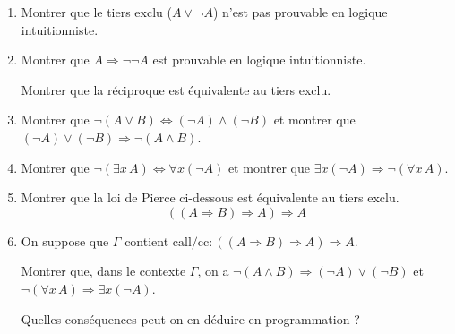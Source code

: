 \documentclass{article}
\begin{document}
\begin{enumerate}
\item Montrer que le tiers exclu (\(A \vee \neg A\)) n'est pas prouvable en logique intuitionniste.
\item Montrer que \(A \Rightarrow \neg \neg A\) est prouvable en logique intuitionniste.

  Montrer que la réciproque est équivalente au tiers exclu.
\item Montrer que \(\neg (A \vee B) \Leftrightarrow (\neg A) \wedge (\neg B)\)
et montrer que \((\neg A) \vee (\neg B) \Rightarrow \neg (A \wedge B)\).
\item Montrer que \(\neg (\exists x \, A) \Leftrightarrow \forall x (\neg A)\)
et montrer que \(\exists x (\neg A) \Rightarrow \neg (\forall x \, A)\).
\item Montrer que la loi de Pierce ci-dessous est équivalente au tiers exclu.
  \[((A \Rightarrow B) \Rightarrow A) \Rightarrow A\]
\item On suppose que \(\Gamma\) contient \(\text{call/cc} : ((A \Rightarrow B) \Rightarrow A) \Rightarrow A\).

Montrer que, dans le contexte \(\Gamma\), on a \(\neg (A \wedge B) \Rightarrow (\neg A) \vee (\neg B)\)
et \(\neg (\forall x \, A) \Rightarrow \exists x (\neg A)\).

  Quelles conséquences peut-on en déduire en programmation ?
\end{enumerate}
\end{document}
